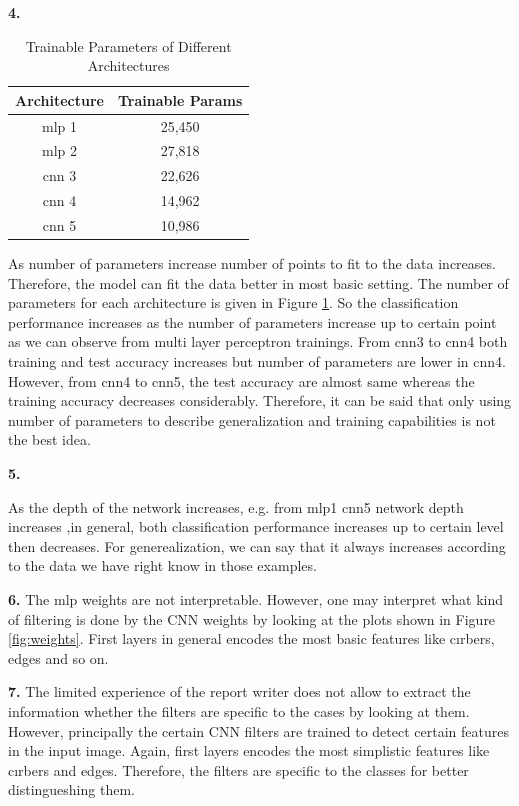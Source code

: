 \documentclass{assignment}
\begin{document}
\textbf{4.}

\begin{table}[h]
    \centering
    \begin{tabular}{|c|c|}
    \hline
    \textbf{Architecture} & \textbf{Trainable Params} \\
    \hline
    mlp 1 & 25,450 \\
    mlp 2 & 27,818 \\
    cnn 3 & 22,626 \\
    cnn 4 & 14,962 \\
    cnn 5 & 10,986 \\
    \hline
    \end{tabular}
    \caption{Trainable Parameters of Different Architectures}
    \label{table:TrinableParams}
\end{table}


As number of parameters increase number of points to fit to the data increases. Therefore, the model can fit the data better in most basic setting. The number of parameters for each architecture is given in Figure \ref{table:TrinableParams}. So the classification performance increases as the number of parameters increase up to certain point as we can observe from multi layer perceptron trainings. From cnn3 to cnn4 both training and test accuracy increases but number of parameters are lower in cnn4. However, from cnn4 to cnn5, the test accuracy are almost same whereas the training accuracy decreases considerably. Therefore, it can be said that only using number of parameters to describe generalization and training capabilities is not the best idea. 

\textbf{5.}

As the depth of the network increases, e.g. from mlp1 cnn5 network depth increases ,in general, both classification performance increases up to certain level then decreases. For generealization, we can say that it always increases according to the data we have right know in those examples. 


\textbf{6.}
The mlp weights are not interpretable. However, one may interpret what kind of filtering is done by the CNN weights by looking at the plots shown in Figure \ref{fig:weights}. First layers in general encodes the most basic features like cırbers, edges and so on.

\textbf{7.}
The limited experience of the report writer does not allow to extract the information whether the filters are specific to the cases by looking at them. However, principally the certain CNN filters are trained to detect certain features in the input image. Again, first layers encodes the most simplistic features like cırbers and edges. Therefore, the filters are specific to the classes for better distingueshing them. 
\end{document}
